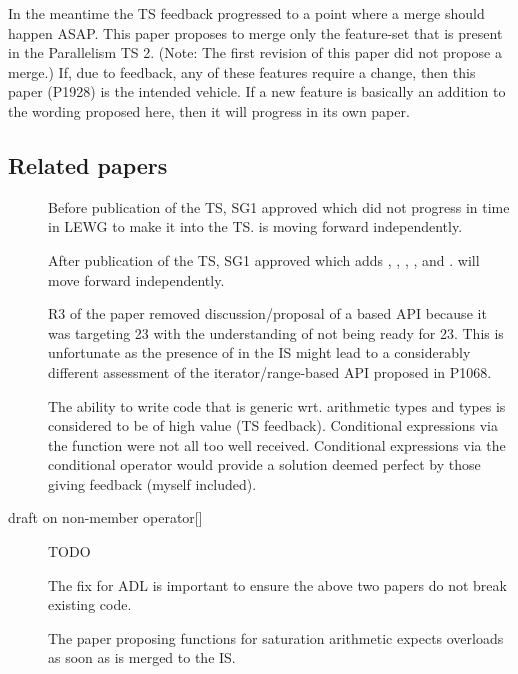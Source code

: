 In the meantime the TS feedback progressed to a point where a merge should happen ASAP.
This paper proposes to merge only the feature-set that is present in the Parallelism TS 2.
(Note: The first revision of this paper did not propose a merge.)
If, due to feedback, any of these features require a change, then this paper (P1928) is the intended vehicle.
If a new feature is basically an addition to the wording proposed here, then it will progress in its own paper.

\subsection{Related papers}
\begin{description}
  \item[] Before publication of the TS, SG1 approved \cite{P0350R0} which did not progress in time in LEWG to make it into the TS.
     is moving forward independently.

  \item[] After publication of the TS, SG1 approved \cite{P0918R2} which adds , , , , and .
     will move forward independently.

  \item[] R3 of the paper removed discussion/proposal of a  based API because it was targeting \CC{}23 with the understanding of  not being ready for \CC{}23.
    This is unfortunate as the presence of  in the IS might lead to a considerably different assessment of the iterator/range-based API proposed in P1068.

  \item[] The ability to write code that is generic wrt. arithmetic types and  types is considered to be of high value (TS feedback).
    Conditional expressions via the  function were not all too well received.
    Conditional expressions via the conditional operator would provide a solution deemed perfect by those giving feedback (myself included).

  \item[draft on non-member {operator[]}] TODO

  \item[] The fix for ADL is important to ensure the above two papers do not break existing code.

  \item[] The paper proposing functions for saturation arithmetic expects  overloads as soon as  is merged to the IS.


\end{description}
